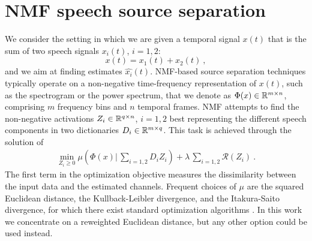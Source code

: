 \section{NMF speech source separation}
\label{nmfsec}

%
We consider the setting in which we are given a temporal signal $x(t)$ that is the sum of  
two speech signals $x_i(t)$, $i=1,2$:
\begin{equation}
\label{ssep}
x(t) = x_1(t) + x_2(t)~,
\end{equation}
and we aim at finding estimates $\widehat{x_i}(t)$.
NMF-based source separation 
techniques typically operate on a non-negative time-frequency representation of $x(t)$, 
such as the spectrogram or the power spectrum,
that we denote as $\Phi(x) \in \mathbb{R}^{m \times n}$, comprising $m$ frequency bins and $n$ temporal frames. 
NMF attempts to find the non-negative activations $Z_i \in \mathbb{R}^{q \times n}$, $i=1,2$ 
best representing the different speech components in two dictionaries ${D}_{i} \in \mathbb{R}^{m \times q}$.
%
This task is achieved through the solution of %
\begin{eqnarray}
\label{eq:optim_general}
\min_{ Z_i \ge 0 } \mu( \Phi(x) |  \, \sum_{i=1,2} {D}_i Z_i  ) + 
\lambda\, \sum_{i=1,2} \mathcal{R}(Z_i)~.
\end{eqnarray}
The first term in the optimization objective measures the dissimilarity between the input data and the estimated channels. 
Frequent choices of $\mu$ are the squared Euclidean distance,
the Kullback-Leibler divergence, and the Itakura-Saito divergence, for which there exist standard optimization algorithms \cite{fevotte2011algorithms}.
In this work we concentrate on a reweighted Euclidean distance, but any other option could be used instead.
%
